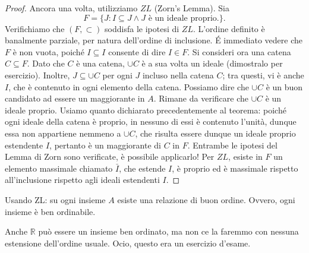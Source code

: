 \begin{proof}
  Ancora una volta, utilizziamo \(ZL\) (Zorn's Lemma). Sia
  \begin{equation}
    F = \lbrace J \colon I \subseteq J \land J\, \, \text{è un ideale proprio.} \rbrace.
  \end{equation}
  Verifichiamo che \((F,\subset)\) soddisfa le ipotesi di \(ZL\). L'ordine definito è banalmente parziale, per natura dell'ordine di inclusione.
  \'E immediato vedere che \(F\) è non vuota, poiché \(I \subseteq I\) consente di dire \(I \in F\). Si consideri ora una catena \(C \subseteq F\). Dato che \(C\) è una catena, \(\cup C\) è a sua volta un ideale (dimostralo per esercizio). Inoltre, \(J \subseteq \cup C\) per ogni \(J\) incluso nella catena \(C\); tra questi, vi è anche \(I\), che è contenuto in ogni elemento della catena. Possiamo dire che \(\cup C\) è un buon candidato ad essere un maggiorante in \(A\). Rimane da verificare che \(\cup C\) è un ideale proprio. Usiamo quanto dichiarato precedentemente al teorema: poiché ogni ideale della catena è proprio, in nessuno di essi è contenuto l'unità, dunque essa non appartiene nemmeno a \(\cup C\), che risulta essere dunque un ideale proprio estendente \(I\), pertanto è un maggiorante di \(C\) in \(F\). Entrambe le ipotesi del Lemma di Zorn sono verificate, è possibile applicarlo! Per \(ZL\), esiste in \(F\) un elemento massimale chiamato \(\bar{I}\), che estende \(I\), è proprio ed è massimale rispetto all'inclusione rispetto agli ideali estendenti \(I\).
\end{proof}

\begin{prp}
  Usando ZL: su ogni insieme \(A\) esiste una relazione di buon ordine. Ovvero, ogni insieme è ben ordinabile.
\end{prp}

Anche \(\mathbb{R}\) può essere un insieme ben ordinato, ma non ce la faremmo con nessuna estensione dell'ordine usuale. Ocio, questo era un esercizio d'esame.


